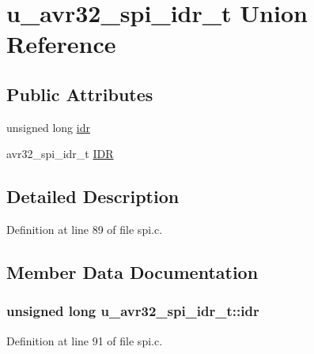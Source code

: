 \hypertarget{unionu__avr32__spi__idr__t}{}\section{u\+\_\+avr32\+\_\+spi\+\_\+idr\+\_\+t Union Reference}
\label{unionu__avr32__spi__idr__t}
\subsection*{Public Attributes}
\begin{DoxyCompactItemize}
\item 
unsigned long \hyperlink{unionu__avr32__spi__idr__t_a2d18e7136f65428cfb8b3f137371a799}{idr}
\item 
avr32\+\_\+spi\+\_\+idr\+\_\+t \hyperlink{unionu__avr32__spi__idr__t_a06ada7c165b785398d24060fc7585668}{I\+D\+R}
\end{DoxyCompactItemize}


\subsection{Detailed Description}


Definition at line 89 of file spi.\+c.



\subsection{Member Data Documentation}
\hypertarget{unionu__avr32__spi__idr__t_a2d18e7136f65428cfb8b3f137371a799}{}
\subsubsection[{idr}]{\setlength{\rightskip}{0pt plus 5cm}unsigned long u\+\_\+avr32\+\_\+spi\+\_\+idr\+\_\+t\+::idr}\label{unionu__avr32__spi__idr__t_a2d18e7136f65428cfb8b3f137371a799}


Definition at line 91 of file spi.\+c.

\hypertarget{unionu__avr32__spi__idr__t_a06ada7c165b785398d24060fc7585668}{}
